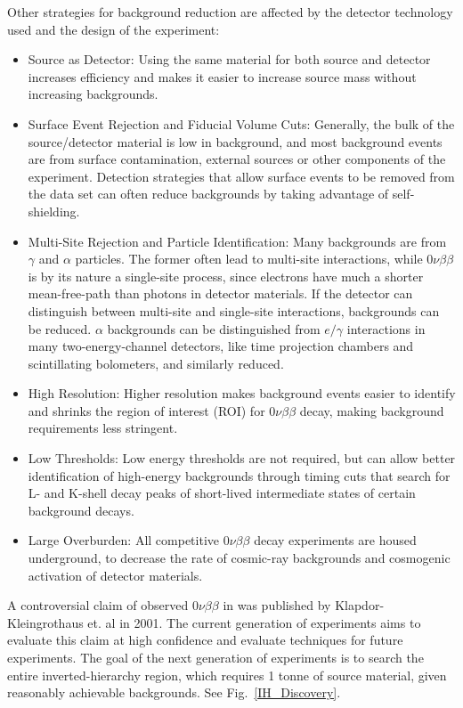 Other strategies for background reduction are affected by the detector technology used and the design of the experiment:
\begin{itemize}
\item Source as Detector: Using the same material for both source and detector increases efficiency and makes it easier to increase source mass without increasing backgrounds.
\item Surface Event Rejection and Fiducial Volume Cuts: Generally, the bulk of the source/detector material is low in background, and most background events are from surface contamination, external sources or other components of the experiment. Detection strategies that allow surface events to be removed from the data set can often reduce backgrounds by taking advantage of self-shielding.
\item Multi-Site Rejection and Particle Identification: Many backgrounds are from $\gamma$ and $\alpha$ particles. The former often lead to multi-site interactions, while $0\nu\beta\beta$ is by its nature a single-site process, since electrons have much a shorter mean-free-path than photons in detector materials. If the detector can distinguish between multi-site and single-site interactions, backgrounds can be reduced. $\alpha$ backgrounds can be distinguished from $e/\gamma$ interactions in many two-energy-channel detectors, like time projection chambers and scintillating bolometers, and similarly reduced. 
\item High Resolution: Higher resolution makes background events easier to identify and shrinks the region of interest (ROI) for $0\nu\beta\beta$ decay, making background requirements less stringent.
\item Low Thresholds: Low energy thresholds are not required, but can allow better identification of high-energy backgrounds through timing cuts that search for L- and K-shell decay peaks of short-lived intermediate states of certain background decays. 
\item Large Overburden: All competitive $0\nu\beta\beta$ decay experiments are housed underground, to decrease the rate of cosmic-ray backgrounds and cosmogenic activation of detector materials. 
\end{itemize}

A controversial claim of observed $0\nu\beta\beta$ in  was published by Klapdor-Kleingrothaus et. al \cite{KK2001} in 2001. The current generation of experiments aims to evaluate this claim at high confidence and evaluate techniques for future experiments. The goal of the next generation of experiments is to search the entire inverted-hierarchy region, which requires 1 tonne of source material, given reasonably achievable backgrounds. See Fig.~\ref{IH_Discovery}. 

